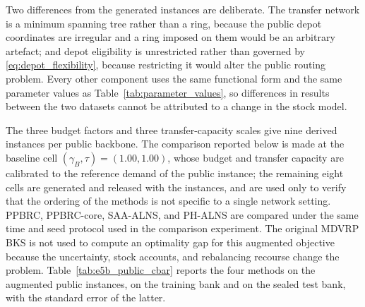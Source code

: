 \documentclass[authoryear,final,3p,times]{elsarticle}
\theoremstyle{definition}
\theoremstyle{plain}
\begin{document}
Two differences from the generated instances are deliberate.  The transfer
network is a minimum spanning tree rather than a ring, because the public
depot coordinates are irregular and a ring imposed on them would be an
arbitrary artefact; and depot eligibility is unrestricted rather than
governed by \eqref{eq:depot_flexibility}, because restricting it would alter
the public routing problem.  Every other component uses the same functional
form and the same parameter values as Table~\ref{tab:parameter_values}, so
differences in results between the two datasets cannot be attributed to a
change in the stock model.

The three budget factors and three transfer-capacity scales give nine derived
instances per public backbone.  The comparison reported below is made at the
baseline cell $(\gamma_B,\tau)=(1.00,1.00)$, whose budget and transfer
capacity are calibrated to the reference demand of the public instance; the
remaining eight cells are generated and released with the instances, and are
used only to verify that the ordering of the methods is not specific to a
single network setting.  PPBRC, PPBRC-core, SAA-ALNS, and PH-ALNS are compared
under the same time and seed protocol used in the comparison experiment. The original MDVRP BKS is
not used to compute an optimality gap for this augmented objective because the
uncertainty, stock accounts, and rebalancing recourse change the problem.
Table~\ref{tab:e5b_public_cbar} reports the four methods on the augmented
public instances, on the training bank and on the sealed test bank, with the
standard error of the latter.

\begin{table}[!htbp]
\centering
\caption{Algorithm comparison on public Cordeau instances with the stock-account overlay (E5b).}
\label{tab:e5b_public_cbar}
\end{table}
\end{document}
